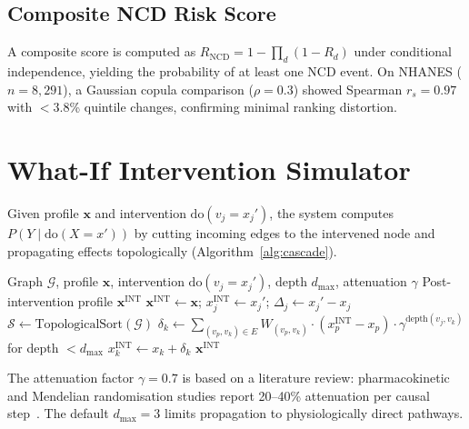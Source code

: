 \documentclass[runningheads]{llncs}
\begin{document}
\subsection{Composite NCD Risk Score}\label{sec:composite}

A composite score is computed as
$R_{\mathrm{NCD}} = 1 - \prod_{d} (1 - R_d)$
under conditional independence, yielding the probability of at least
one NCD event.
On NHANES ($n = 8{,}291$), a Gaussian copula comparison
($\rho = 0.3$) showed Spearman $r_s = 0.97$ with $<$3.8\%
quintile changes, confirming minimal ranking distortion.

\section{What-If Intervention Simulator}\label{sec:whatif}

Given profile $\mathbf{x}$ and intervention
$\mathrm{do}(v_j = x_j')$, the system computes
$P(Y \mid \mathrm{do}(X = x'))$ by cutting incoming edges to the
intervened node and propagating effects topologically
(Algorithm~\ref{alg:cascade}).

\begin{algorithm}[t]
\caption{Topological Intervention Cascade}
\label{alg:cascade}
\begin{algorithmic}[1]
\REQUIRE Graph $\mathcal{G}$, profile $\mathbf{x}$, intervention
  $\mathrm{do}(v_j = x_j')$, depth $d_{\max}$, attenuation $\gamma$
\ENSURE Post-intervention profile $\mathbf{x}^{\mathrm{INT}}$
\STATE $\mathbf{x}^{\mathrm{INT}} \leftarrow \mathbf{x}$;
  $x_j^{\mathrm{INT}} \leftarrow x_j'$;
  $\Delta_j \leftarrow x_j' - x_j$
\STATE $\mathcal{S} \leftarrow \text{TopologicalSort}(\mathcal{G})$
  \STATE $\delta_k \leftarrow \sum_{(v_p, v_k) \in E} W_{(v_p,v_k)} \cdot (x_p^{\mathrm{INT}} - x_p) \cdot \gamma^{\text{depth}(v_j,v_k)}$ for depth $< d_{\max}$
  \STATE $x_k^{\mathrm{INT}} \leftarrow x_k + \delta_k$
\ENDFOR
\RETURN $\mathbf{x}^{\mathrm{INT}}$
\end{algorithmic}
\end{algorithm}

The attenuation factor $\gamma = 0.7$ is based on a literature review:
pharmacokinetic and Mendelian randomisation studies report 20--40\%
attenuation per causal step~\cite{ctt2010,pearl2009causality}.
The default $d_{\max} = 3$ limits propagation to physiologically
direct pathways.
\end{document}
